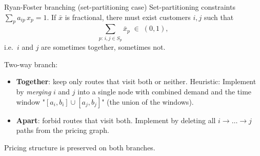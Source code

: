 \documentclass[10pt,aspectratio=169]{beamer}
\begin{document}
\begin{frame}{Ryan-Foster branching (set-partitioning case)}
  Set-partitioning constraints $\sum_p a_{ip}\,x_p = 1$. If $\bar x$ is fractional,
  there must exist customers $i,j$ such that
  \[
    \sum_{p:\,i,j\in S_p} \bar x_p \;\in\; (0,1),
  \]
  i.e.\ $i$ and $j$ are \alert{sometimes} together, \alert{sometimes} not.

  \medskip
  Two-way branch:
  \begin{itemize}\small
    \item \textbf{Together}: keep only routes that visit \alert{both or neither}.
          Heuristic: Implement by \emph{merging} $i$ and $j$ into a single node with combined demand and the time window
          "$[a_i,b_i]\cup[a_j,b_j]$" (the union of the windows).
    \item \textbf{Apart}: forbid routes that visit \alert{both}. Implement by
          deleting all $i\!\to\!\dots\!\to\!j$ paths from the pricing graph.
  \end{itemize}
  Pricing structure is preserved on both branches.
\end{frame}
\end{document}
